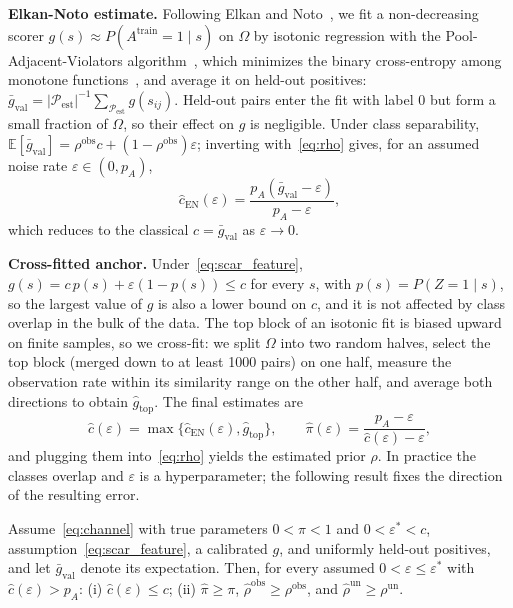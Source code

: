 \documentclass[sigconf]{acmart}
\begin{document}
\textbf{Elkan-Noto estimate.} Following Elkan and Noto~\cite{10.1145/1401890.1401920}, we fit a non-decreasing scorer $g(s) \approx P(A^{\text{train}}=1 \mid s)$ on $\Omega$ by isotonic regression with the Pool-Adjacent-Violators algorithm~\cite{ayer1955empirical, barlow1972statistical, zadrozny2002transforming}, which minimizes the binary cross-entropy among monotone functions~\cite{brummer2013pav}, and average it on held-out positives: $\bar{g}_{\text{val}} = |\mathcal{P}_{\text{est}}|^{-1} \sum_{\mathcal{P}_{\text{est}}} g(s_{ij})$. Held-out pairs enter the fit with label $0$ but form a small fraction of $\Omega$, so their effect on $g$ is negligible. Under class separability, $\mathbb{E}[\bar{g}_{\text{val}}] = \rho^{\text{obs}} c + (1-\rho^{\text{obs}})\varepsilon$; inverting with~\eqref{eq:rho} gives, for an assumed noise rate $\varepsilon \in (0, p_A)$,
\begin{equation}
    \hat{c}_{\text{EN}}(\varepsilon) = \frac{p_A(\bar{g}_{\text{val}} - \varepsilon)}{p_A - \varepsilon}, \label{eq:noise_corrected_en}
\end{equation}
which reduces to the classical $\hat{c} = \bar{g}_{\text{val}}$ as $\varepsilon \to 0$.

\textbf{Cross-fitted anchor.} Under~\eqref{eq:scar_feature}, $g(s) = c\,p(s) + \varepsilon(1-p(s)) \le c$ for every $s$, with $p(s) = P(Z=1 \mid s)$, so the largest value of $g$ is also a lower bound on $c$, and it is not affected by class overlap in the bulk of the data. The top block of an isotonic fit is biased upward on finite samples, so we cross-fit: we split $\Omega$ into two random halves, select the top block (merged down to at least 1000 pairs) on one half, measure the observation rate within its similarity range on the other half, and average both directions to obtain $\hat{g}_{\text{top}}$. The final estimates are
\begin{equation}
    \hat{c}(\varepsilon) = \max\{\hat{c}_{\text{EN}}(\varepsilon), \hat{g}_{\text{top}}\}, \qquad \hat{\pi}(\varepsilon) = \frac{p_A - \varepsilon}{\hat{c}(\varepsilon) - \varepsilon}, \label{eq:c_hat}
\end{equation}
and plugging them into~\eqref{eq:rho} yields the estimated prior $\hat{\rho}$. In practice the classes overlap and $\varepsilon$ is a hyperparameter; the following result fixes the direction of the resulting error.

\begin{proposition}
\label{prop:bracket}
Assume~\eqref{eq:channel} with true parameters $0 < \pi < 1$ and $0 < \varepsilon^\ast < c$, assumption~\eqref{eq:scar_feature}, a calibrated $g$, and uniformly held-out positives, and let $\bar{g}_{\text{val}}$ denote its expectation. Then, for every assumed $0 < \varepsilon \le \varepsilon^\ast$ with $\hat{c}(\varepsilon) > p_A$: (i) $\hat{c}(\varepsilon) \le c$; (ii) $\hat{\pi} \ge \pi$, $\hat{\rho}^{\text{obs}} \ge \rho^{\text{obs}}$, and $\hat{\rho}^{\text{un}} \ge \rho^{\text{un}}$.
\end{proposition}
\end{document}
